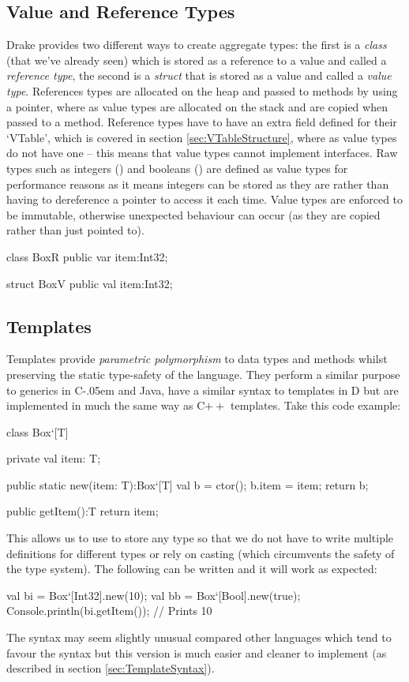 \documentclass{article}
\newcommand{\bt}{\ensuremath{^{\backprime}}}
\newcommand{\sharponend}[1]{{\settoheight{\dimen0}{#1}#1\kern-.05em \resizebox{!}{\dimen0}{\raisebox{\depth}{\fontseries{b}\selectfont\#}}}}
\newcommand{\csharp}{\sharponend{C}\xspace}
\newcommand*{\cpp}{C\ensuremath{++}\xspace}
\newcommand{\code}[1]{\texttt{\StrSubstitute{#1}{`}{\bt}}}
\newcommand{\bcode}[1]{\code{#1}}
\newcommand{\plname}[0]{Drake\xspace}
\begin{document}
\subsection{Value and Reference Types}
\plname provides two different ways to create aggregate types: the first is a \textit{class} (that we've already seen) which is stored as a reference to a value and called a \textit{reference type}, the second is a \textit{struct} that is stored as a value and called a \textit{value type}. References types are allocated on the heap and passed to methods by using a pointer, where as value types are allocated on the stack and are copied when passed to a method. Reference types have to have an extra field defined for their `VTable', which is covered in section \ref{sec:VTableStructure}, where as value types do not have one -- this means that value types cannot implement interfaces. Raw types such as integers (\bcode{Int*}) and booleans (\bcode{Bool}) are defined as value types for performance reasons as it means integers can be stored as they are rather than having to dereference a pointer to access it each time. Value types are enforced to be immutable, otherwise unexpected behaviour can occur (as they are copied rather than just pointed to).

\begin{sooplisting}
class BoxR {
	public var item:Int32;
}

struct BoxV {
	public val item:Int32;
}
\end{sooplisting}

\subsection{Templates}
Templates provide \textit{parametric polymorphism} to data types and methods whilst preserving the static type-safety of the language. They perform a similar purpose to generics in \csharp and Java, have a similar syntax to templates in D but are implemented in much the same way as \cpp templates. Take this code example:

\begin{sooplisting}
class Box`[T] {
	private val item: T;
	
	public static new(item: T):Box`[T] {
		val b = ctor();
		b.item = item;
		return b;
	}
	
	public getItem():T { return item; }
}
\end{sooplisting}
This allows us to use \bcode{Box`[T]} to store any type so that we do not have to write multiple definitions for different types or rely on casting (which circumvents the safety of the type system). The following can be written and it will work as expected:
\begin{sooplisting}
val bi = Box`[Int32].new(10);
val bb = Box`[Bool].new(true);
Console.println(bi.getItem()); // Prints 10
\end{sooplisting}
The \bcode{Type`[T1,T2,...,TN]} syntax may seem slightly unusual compared other languages which tend to favour the \bcode{Type<T1,T2,...,TN>} syntax but this version is much easier and cleaner to implement (as described in section \ref{sec:TemplateSyntax}).
\end{document}
